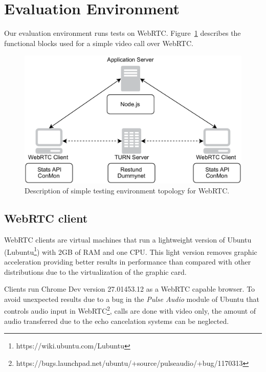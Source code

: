 \section{Evaluation Environment}
\label{sec:testingEnv}

\thispagestyle{empty}

Our evaluation environment runs tests on WebRTC. Figure~\ref{fig:evaluation_arch} describes the functional blocks used for a simple video call over WebRTC.

 \begin{figure}[h]
  \centering
    \includegraphics[width=1\textwidth]{./figures/evaluation_arch.pdf}
      \caption[Description of simple testing environment topology for WebRTC]{Description of simple testing environment topology for WebRTC.}
	\label{fig:evaluation_arch}
\end{figure}

\subsection{WebRTC client}

WebRTC clients are virtual machines that run a lightweight version of Ubuntu (Lubuntu\footnote{https://wiki.ubuntu.com/Lubuntu}) with 2GB of RAM and one CPU. This light version removes graphic acceleration providing better results in performance than compared with other distributions due to the virtualization of the graphic card. 

Clients run Chrome Dev version 27.01453.12 as a WebRTC capable browser. To avoid unexpected results due to a bug in the {\it Pulse Audio} module of Ubuntu that controls audio input in WebRTC\footnote{https://bugs.launchpad.net/ubuntu/+source/pulseaudio/+bug/1170313}, calls are done with video only, the amount of audio transferred due to the echo cancelation systems can be neglected.

